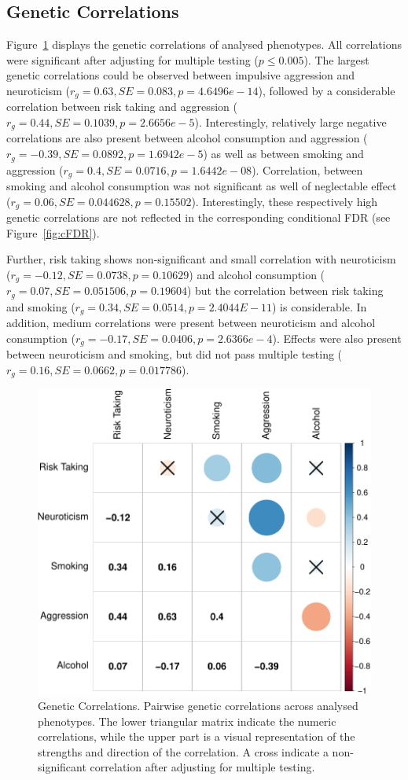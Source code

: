 \subsection{Genetic Correlations}
\label{sub:genetic_correlations_internal}

Figure~\ref{fig:gcor} displays the genetic correlations of analysed phenotypes.
All correlations were significant after adjusting for multiple testing ($p\leq0.005$).
The largest genetic correlations could be observed between impulsive aggression and neuroticism ($r_g=0.63, SE=0.083, p=4.6496e-14$), 
followed by a considerable correlation between risk taking and aggression ($r_g=0.44, SE=0.1039, p=2.6656e-5$).
Interestingly, relatively large negative correlations are also present between alcohol consumption and aggression ($r_g=-0.39, SE=0.0892, p=1.6942e-5$)
as well as between smoking and aggression ($r_g=0.4, SE=0.0716, p=1.6442e-08$).
Correlation, between smoking and alcohol consumption was not significant as well of neglectable effect ($r_g=0.06, SE=0.044628, p=0.15502$).
Interestingly, these respectively high genetic correlations are not reflected in the corresponding conditional FDR (see Figure~\ref{fig:cFDR}).

Further, risk taking shows non-significant and small correlation with neuroticism ($r_g=-0.12, SE=0.0738, p=0.10629$) and
alcohol consumption ($r_g=0.07, SE=0.051506, p=0.19604$) but the correlation between risk taking and smoking ($r_g=0.34, SE=0.0514, p=2.4044E-11$) is considerable.
In addition, medium correlations were present between neuroticism and alcohol consumption ($r_g=-0.17, SE=0.0406, p=2.6366e-4$). 
Effects were also present between neuroticism and smoking, but did not pass multiple testing ($r_g=0.16, SE=0.0662, p=0.017786$).

\begin{figure}[!h]
	\centering
  \includegraphics[width=0.8\linewidth]{ukb_assoc/figure/genetic_corr/gcorr_plot_circle_full_se.pdf}
  \caption{Genetic Correlations.
    Pairwise genetic correlations across analysed phenotypes.
    The lower triangular matrix indicate the numeric correlations, while the upper part is a visual representation of the strengths and direction of the correlation.
    A cross indicate a non-significant correlation after adjusting for multiple testing.
  }\label{fig:gcor}
\end{figure}
